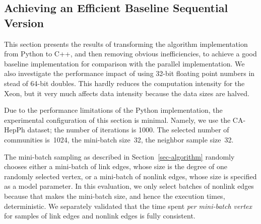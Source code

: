 \subsection{Achieving an Efficient Baseline Sequential Version}

This section presents the results of transforming the algorithm implementation
from Python to C++, and then removing obvious inefficiencies, to achieve a
good baseline implementation for comparison with the parallel implementation.
%
We also investigate the performance impact of using
32-bit floating point numbers in stead of 64-bit doubles.
This hardly reduces the computation intensity for the Xeon, but it very much
affects data intensity because the data sizes are halved.
%

Due to the performance limitations of the Python implementation, the
experimental configuration of this section is minimal.
%
Namely, we use the CA-HepPh dataset; the number of
iterations is 1000.
The selected number of communities is~1024, the mini-batch size~32, the
neighbor sample size~32.

The mini-batch sampling as described in Section~\ref{sec-algorithm} randomly
chooses either a mini-batch of link edges, whose size is the degree of one
randomly selected vertex, or a mini-batch of nonlink edges, whose size is
specified as a model parameter. In this evaluation, we only select batches
of nonlink edges because that makes the mini-batch size, and hence the
execution times, deterministic. We separately validated that the time spent
\textit{per mini-batch vertex} for samples of link edges and nonlink edges
is fully consistent.

